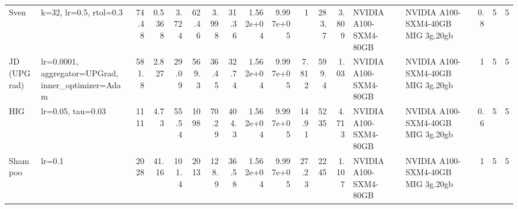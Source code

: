 \begin{tabular}{llrrrrrrrrrrrllrrr}
Sven & k=32, lr=0.5, rtol=0.3 & 74.48 & 0.5368 & 3.724 & 62.46 & 3.998 & 31.36 & 1.562e+04 & 9.997e+05 & 1 & 283.7 & 3.809 & NVIDIA A100-SXM4-80GB & NVIDIA A100-SXM4-40GB MIG 3g.20gb & 0.8 & 5 & 5 \\
JD (UPGrad) & lr=0.0001, aggregator=UPGrad, inner\_optimizer=Adam & 581.8 & 2.827 & 29.09 & 569.3 & 36.45 & 32.74 & 1.562e+04 & 9.997e+05 & 7.812 & 599.4 & 1.03 & NVIDIA A100-SXM4-80GB & NVIDIA A100-SXM4-40GB MIG 3g.20gb & 1 & 5 & 5 \\
HIG & lr=0.05, tau=0.03 & 1111 & 4.73 & 55.54 & 1098 & 70.29 & 404.3 & 1.562e+04 & 9.997e+05 & 14.91 & 5235 & 4.713 & NVIDIA A100-SXM4-80GB & NVIDIA A100-SXM4-40GB MIG 3g.20gb & 0.6 & 5 & 5 \\
Shampoo & lr=0.1 & 2028 & 41.16 & 101.4 & 2013 & 128.9 & 36.58 & 1.562e+04 & 9.997e+05 & 27.23 & 2245 & 1.107 & NVIDIA A100-SXM4-80GB & NVIDIA A100-SXM4-40GB MIG 3g.20gb & 1 & 5 & 5 \\
\bottomrule
\end{tabular}
